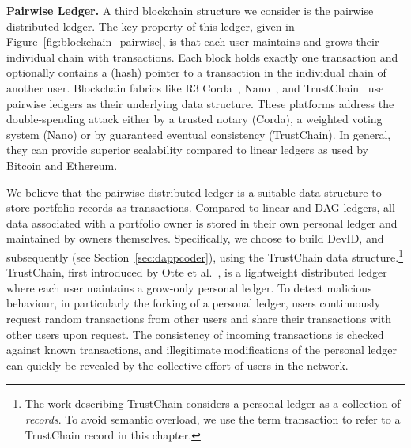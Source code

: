 \textbf{Pairwise Ledger.} A third blockchain structure we consider is the pairwise distributed ledger.
The key property of this ledger, given in Figure~\ref{fig:blockchain_pairwise}, is that each user maintains and grows their individual chain with transactions.
Each block holds exactly one transaction and optionally contains a (hash) pointer to a transaction in the individual chain of another user.
Blockchain fabrics like R3 Corda~\cite{r3corda}, Nano~\cite{lemahieu2017raiblocks}, and TrustChain~\cite{otte2017trustchain} use pairwise ledgers as their underlying data structure.
These platforms address the double-spending attack either by a trusted notary (Corda), a weighted voting system (Nano) or by guaranteed eventual consistency (TrustChain).
In general, they can provide superior scalability compared to linear ledgers as used by Bitcoin and Ethereum.

We believe that the pairwise distributed ledger is a suitable data structure to store portfolio records as transactions.
Compared to linear and DAG ledgers, all data associated with a portfolio owner is stored in their own personal ledger and maintained by owners themselves.
Specifically, we choose to build DevID, and subsequently \Dappcoder{} (see Section~\ref{sec:dappcoder}), using the TrustChain data structure.\footnote{The work describing TrustChain considers a personal ledger as a collection of \emph{records}. To avoid semantic overload, we use the term transaction to refer to a TrustChain record in this chapter.}
TrustChain, first introduced by Otte et al.~\cite{otte2017trustchain}, is a lightweight distributed ledger where each user maintains a grow-only personal ledger.
To detect malicious behaviour, in particularly the forking of a personal ledger, users continuously request random transactions from other users and share their transactions with other users upon request.
The consistency of incoming transactions is checked against known transactions, and illegitimate modifications of the personal ledger can quickly be revealed by the collective effort of users in the network.

